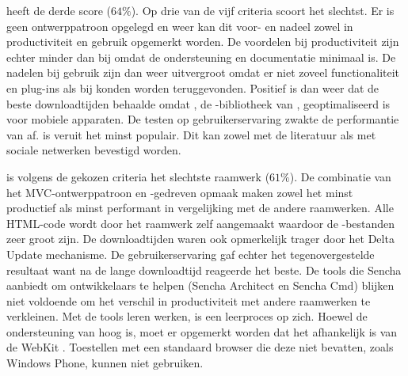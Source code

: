 \lungo{} heeft de derde score ($64\%$).
Op drie van de vijf criteria scoort \lungo{} het slechtst.
Er is geen ontwerppatroon opgelegd en weer kan dit voor- en nadeel zowel in productiviteit en gebruik opgemerkt worden.
De voordelen bij productiviteit zijn echter minder dan bij \jqm{} omdat de ondersteuning en documentatie minimaal is.
De nadelen bij gebruik zijn dan weer uitvergroot omdat er niet zoveel functionaliteit en plug-ins als bij \jqm{} konden worden teruggevonden.
Positief is dan weer dat \lungo{} de beste downloadtijden behaalde omdat \quo{}, de \js{}-bibliotheek van \lungo{},  geoptimaliseerd is voor mobiele apparaten.
De testen op gebruikerservaring zwakte de performantie van \lungo{} af.
\lungo{} is veruit het minst populair.
Dit kan zowel met de literatuur als met sociale netwerken bevestigd worden.


\st{} is volgens de gekozen criteria het slechtste raamwerk ($61\%$).
De combinatie van het MVC-ontwerppatroon en \js-gedreven opmaak maken \st{} zowel het minst productief als minst performant in vergelijking met de andere raamwerken.
Alle HTML-code wordt door het raamwerk zelf aangemaakt waardoor de \js-bestanden zeer groot zijn.
De downloadtijden waren ook opmerkelijk trager door het Delta Update mechanisme.
De gebruikerservaring gaf echter het tegenovergestelde resultaat want na de lange downloadtijd reageerde \st{} het beste.
De tools die Sencha aanbiedt om ontwikkelaars te helpen (Sencha Architect en Sencha Cmd) blijken niet voldoende om het verschil in productiviteit met andere raamwerken te verkleinen.
Met de tools leren werken, is een leerproces op zich.
Hoewel de ondersteuning van \st{} hoog is, moet er opgemerkt worden dat het afhankelijk is van de WebKit .
Toestellen met een standaard browser die deze  niet bevatten, zoals Windows Phone,  kunnen \st{} niet gebruiken.



